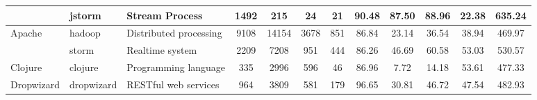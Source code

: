 \begin{table*}[]
{\begin{tabular}{lllccccccccc}
                            & jstorm                                                        & Stream Process                                                           & 1492           & 215             & 24                                                               & 21             & 90.48          & 87.50          & 88.96          & 22.38                                                                                 & 635.24                                               \\ \hline
\multirow{2}{*}{Apache}     & hadoop                                                        & Distributed processing                                                   & 9108           & 14154           & 3678                                                             & 851            & 86.84          & 23.14          & 36.54          & 38.94                                                                                 & 469.97                                               \\
                            & storm                                                         & Realtime system                                                          & 2209           & 7208            & 951                                                              & 444            & 86.26          & 46.69          & 60.58          & 53.03                                                                                 & 530.57                                               \\ \hline
Clojure                     & clojure                                                       & Programming language                                                     & 335            & 2996            & 596                                                              & 46             & 86.96          & 7.72           & 14.18          & 53.61                                                                                 & 477.33                                               \\ \hline
\multirow{2}{*}{Dropwizard} & dropwizard                                                    & RESTful web services                                                     & 964            & 3809            & 581                                                              & 179            & 96.65          & 30.81          & 46.72          & 47.54                                                                                 & 482.93                                               \\

\end{tabular}}
\end{table*}
